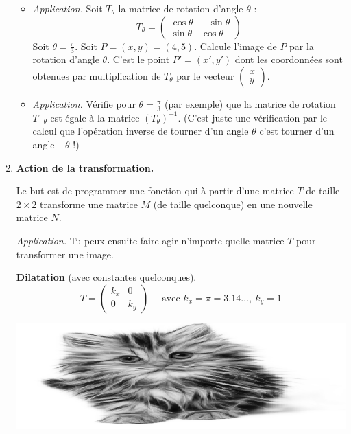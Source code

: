 \documentclass[11pt,class=report,crop=false]{standalone}
\begin{document}
\begin{activite}
\begin{enumerate}
\begin{itemize}
		\item \emph{Application.}
		Soit $T_\theta$ la matrice de rotation d'angle $\theta$ :
		$$T_\theta = \begin{pmatrix}\cos \theta& -\sin \theta\\\sin\theta&\cos\theta\end{pmatrix}$$
		Soit $\theta = \frac\pi3$. Soit $P = (x,y) = (4,5)$. Calcule l'image de $P$ par la rotation d'angle $\theta$. C'est le point $P' = (x',y')$ dont les coordonnées sont obtenues par multiplication de $T_\theta$ par le vecteur $\left(\begin{smallmatrix}x\\y\end{smallmatrix}\right)$.
		
		\item \emph{Application.}
		Vérifie pour $\theta=\frac\pi3$ (par exemple) que la matrice de rotation
		$T_{-\theta}$ est égale à la matrice $(T_\theta)^{-1}$. (C'est juste une vérification par le calcul que l'opération inverse de tourner d'un angle $\theta$ c'est tourner d'un angle $-\theta$ !)
		
	\end{itemize}

	\item \textbf{Action de la transformation.}

	Le but est de programmer une fonction  qui à partir d'une matrice $T$ de taille $2\times 2$ transforme une matrice $M$ (de taille quelconque)
	en une nouvelle matrice $N$.
	
	\emph{Application.} Tu peux ensuite faire agir n'importe quelle matrice $T$ pour transformer une image.
	
	\begin{center}
	\begin{minipage}{0.5\textwidth}
		\textbf{Dilatation} (avec constantes quelconques).
		$$T = \begin{pmatrix}k_x&0\\0&k_y\end{pmatrix} \quad \text{ avec } k_x=\pi=3.14\ldots,\  k_y = 1$$	
	\end{minipage}
	\begin{minipage}{0.4\textwidth}\center
		\includegraphics[scale=\myscale,scale=0.3]{png/chat_dilatation}
	\end{minipage}	
    \end{center}
	

\end{enumerate}
\end{activite}
\end{document}
